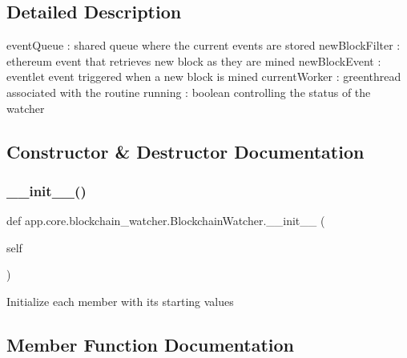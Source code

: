 \subsection{Detailed Description}
\begin{DoxyVerb}eventQueue : shared queue where the current events are stored
newBlockFilter : ethereum event that retrieves new block as they are mined
newBlockEvent : eventlet event triggered when a new block is mined
currentWorker : greenthread associated with the routine
running : boolean controlling the status of the watcher\end{DoxyVerb}
 

\subsection{Constructor \& Destructor Documentation}
\mbox{\label{classapp_1_1core_1_1blockchain__watcher_1_1_blockchain_watcher_a49c89ab962a87230ac53f21d1bf7fe42}} 
\subsubsection{\texorpdfstring{\+\_\+\+\_\+init\+\_\+\+\_\+()}{\_\_init\_\_()}}
{\footnotesize\ttfamily def app.\+core.\+blockchain\+\_\+watcher.\+Blockchain\+Watcher.\+\_\+\+\_\+init\+\_\+\+\_\+ (\begin{DoxyParamCaption}\item[{}]{self }\end{DoxyParamCaption})}

\begin{DoxyVerb}Initialize each member with its starting values
\end{DoxyVerb}
 

\subsection{Member Function Documentation}
\mbox{\label{classapp_1_1core_1_1blockchain__watcher_1_1_blockchain_watcher_ad4605f13f621b889e271eb1e7a94810b}} 
